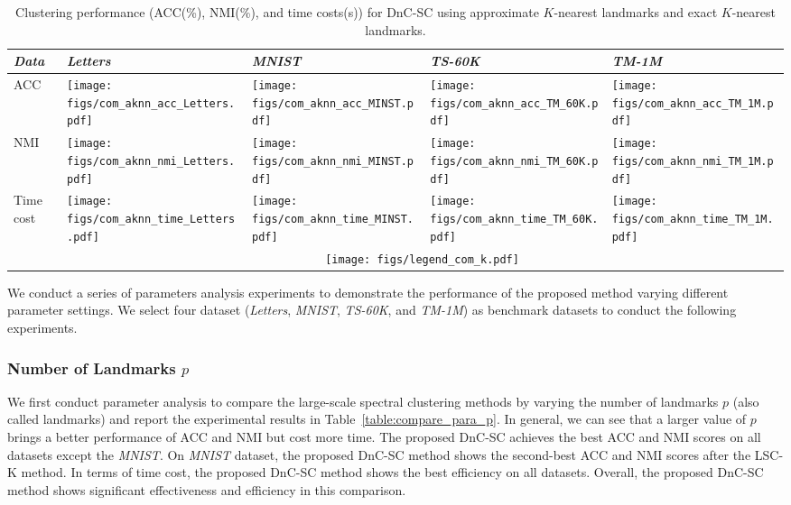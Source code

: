 \begin{table}\centering
  \caption{Clustering performance (ACC(\%), NMI(\%), and time costs(s)) for DnC-SC using approximate $K$-nearest landmarks and exact $K$-nearest landmarks.}
  \label{table:compare_approxKNN}
  \begin{threeparttable}
    \begin{tabular}{m{0.75cm}<{\centering}|m{1.45cm}<{\centering}m{1.45cm}<{\centering}m{1.45cm}<{\centering}m{1.45cm}<{\centering}}
      \toprule
      \emph{Data} & \emph{Letters} & \emph{MNIST} & \emph{TS-60K} & \emph{TM-1M} \\
      \midrule
      \multirow{1}{*}{ACC}
      &\texttt{[image: figs/com\_aknn\_acc\_Letters.pdf]}
      &\texttt{[image: figs/com\_aknn\_acc\_MINST.pdf]}
      &\texttt{[image: figs/com\_aknn\_acc\_TM\_60K.pdf]}
      &\texttt{[image: figs/com\_aknn\_acc\_TM\_1M.pdf]}\\
      NMI
      &\texttt{[image: figs/com\_aknn\_nmi\_Letters.pdf]}
      &\texttt{[image: figs/com\_aknn\_nmi\_MINST.pdf]}
      &\texttt{[image: figs/com\_aknn\_nmi\_TM\_60K.pdf]}
      &\texttt{[image: figs/com\_aknn\_nmi\_TM\_1M.pdf]}\\
      Time cost
      &\texttt{[image: figs/com\_aknn\_time\_Letters.pdf]}
      &\texttt{[image: figs/com\_aknn\_time\_MINST.pdf]}
      &\texttt{[image: figs/com\_aknn\_time\_TM\_60K.pdf]}
      &\texttt{[image: figs/com\_aknn\_time\_TM\_1M.pdf]}\\
      &\multicolumn{4}{c}{\texttt{[image: figs/legend\_com\_k.pdf]}}\\
      \bottomrule
    \end{tabular}
  \end{threeparttable}
\end{table}

We conduct a series of parameters analysis experiments to demonstrate the performance of the proposed method varying different parameter settings.
We select four dataset (\emph{Letters}, \emph{MNIST}, \emph{TS-60K}, and \emph{TM-1M}) as benchmark datasets to conduct the following experiments.

\subsubsection{Number of Landmarks $p$}
\label{sec:para_p}

We first conduct parameter analysis to compare the large-scale spectral clustering methods by varying the number of landmarks $p$ (also called landmarks) and report the experimental results in Table~\ref{table:compare_para_p}.
In general, we can see that a larger value of $p$ brings a better performance of ACC and NMI but cost more time.
The proposed DnC-SC achieves the best ACC and NMI scores on all datasets except the \emph{MNIST}.
On \emph{MNIST} dataset, the proposed DnC-SC method shows the second-best ACC and NMI scores after the LSC-K method.
In terms of time cost, the proposed DnC-SC method shows the best efficiency on all datasets.
Overall, the proposed DnC-SC method shows significant effectiveness and efficiency in this comparison.


